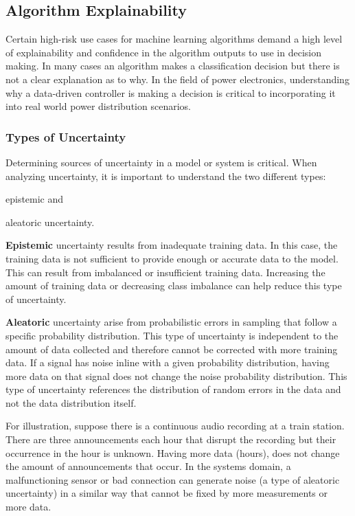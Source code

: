 \subsection{Algorithm Explainability}

Certain high-risk use cases for machine learning algorithms demand a high level of explainability and confidence in the algorithm outputs to use in decision making. In many cases an algorithm makes a classification decision but there is not a clear explanation as to why. In the field of power electronics, understanding why a data-driven controller is making a decision is critical to incorporating it into real world power distribution scenarios.

\subsubsection{Types of Uncertainty}
Determining sources of uncertainty in a model or system is critical. When analyzing uncertainty, it is important to understand the two different types:
\begin{inlinelist}
    \item epistemic and
    \item aleatoric uncertainty.
\end{inlinelist}

\textbf{Epistemic} uncertainty results from inadequate training data. In this case, the training data is not sufficient to provide enough or accurate data to the model.
This can result from imbalanced or insufficient training data.
Increasing the amount of training data or decreasing class imbalance can help reduce this type of uncertainty.

\textbf{Aleatoric} uncertainty arise from probabilistic errors in sampling that follow a specific probability distribution.
This type of uncertainty is independent to the amount of data collected and therefore cannot be corrected with more training data.
If a signal has noise inline with a given probability distribution, having more data on that signal does not change the noise probability distribution.
This type of uncertainty references the distribution of random errors in the data and not the data distribution itself.

For illustration, suppose there is a continuous audio recording at a train station.
There are three announcements each hour that disrupt the recording but their occurrence in the hour is unknown.
Having more data (hours), does not change the amount of announcements that occur.
In the systems domain, a malfunctioning sensor or bad connection can generate noise (a type of aleatoric uncertainty) in a similar way that cannot be fixed by more measurements or more data.

